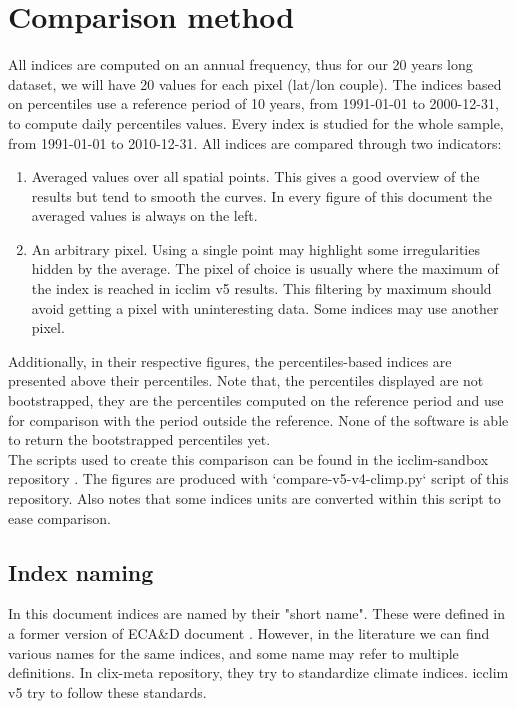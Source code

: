 \documentclass[a4paper,11pt]{article}
\begin{document}
    \section{Comparison method}
        All indices are computed on an annual frequency, thus for our 20 years long dataset, we will have 20 values for each pixel (lat/lon couple).
        The indices based on percentiles use a reference period of 10 years, from 1991-01-01 to 2000-12-31, to compute daily percentiles values.
        Every index is studied for the whole sample, from 1991-01-01 to 2010-12-31.
        All indices are compared through two indicators: 
        \begin{enumerate}
            \item Averaged values over all spatial points. 
                This gives a good overview of the results but tend to smooth the curves. In every figure of this document the averaged values is always on the left.
            \item An arbitrary pixel. 
                Using a single point may highlight some irregularities hidden by the average. 
                The pixel of choice is usually where the maximum of the index is reached in icclim v5 results. 
                This filtering by maximum should avoid getting a pixel with uninteresting data. Some indices may use another pixel.
        \end{enumerate}
        Additionally, in their respective figures, the percentiles-based indices are presented above their percentiles. 
        Note that, the percentiles displayed are not bootstrapped, they are the percentiles computed on the reference period and use for comparison with the period outside the reference. 
        None of the software is able to return the bootstrapped percentiles yet.\\
        
        The scripts used to create this comparison can be found in the icclim-sandbox repository \cite{gh/icclim_sandbox}.
        The figures are produced with `compare-v5-v4-climp.py` script of this repository.
        Also notes that some indices units are converted within this script to ease comparison.

        \subsection{Index naming}
            In this document indices are named by their "short name". These were defined in a former version of ECA\&D document \cite{doc/ecad_old}.
            However, in the literature we can find various names for the same indices, and some name may refer to multiple definitions. In clix-meta \cite{gh/clixmeta} repository, they try to standardize climate indices. 
            icclim v5 try to follow these standards.
\end{document}

